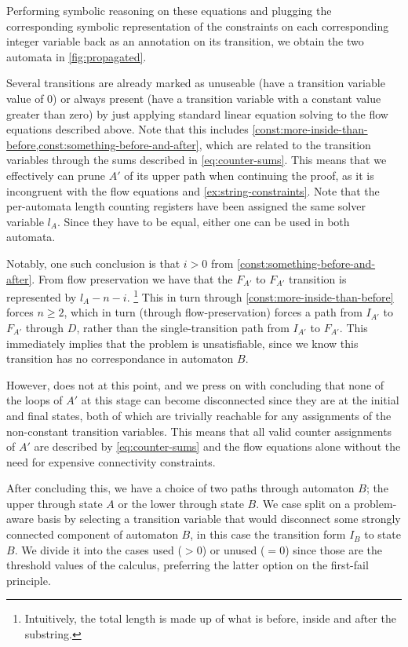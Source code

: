 Performing symbolic reasoning on these equations and plugging the corresponding
symbolic representation of the constraints on each corresponding integer
variable back as an annotation on its transition, we obtain the two automata in
\cref{fig:propagated}.

Several transitions are already marked as unuseable (have a transition variable
value of $0$) or always present (have a transition variable with a constant
value greater than zero) by just applying standard linear equation solving to
the flow equations described above. Note that this includes
\cref{const:more-inside-than-before,const:something-before-and-after}, which are
related to the transition variables through the sums described in
\cref{eq:counter-sums}. This means that we effectively can prune $A'$ of its
upper path when continuing the proof, as it is incongruent with the flow
equations and \cref{ex:string-constraints}. Note that the per-automata length
counting registers have been assigned the same solver variable $l_A$. Since they
have to be equal, either one can be used in both automata.

Notably, one such conclusion is that $i > 0$ from
\cref{const:something-before-and-after}. From flow preservation we have that the
$F_{A'}$ to $F_{A'}$ transition is represented by $l_A - n - i$.
\footnote{Intuitively, the total length is made up of what is before, inside and
after the substring.} This in turn through \cref{const:more-inside-than-before}
forces $n \geq 2$, which in turn (through flow-preservation) forces a path from
$I_{A'}$ to $F_{A'}$ through $D$, rather than the single-transition path from
$I_{A'}$ to $F_{A'}$. This immediately implies that the problem is
unsatisfiable, since we know this transition has no correspondance in automaton
$B$. 

However, \Calculus{} does not at this point, and we press on with concluding
that none of the loops of $A'$ at this stage can become disconnected since
they are at the initial and final states, both of which are trivially reachable
for any assignments of the non-constant transition variables. This means that
all valid counter assignments of $A'$ are described by \cref{eq:counter-sums}
and the flow equations alone without the need for expensive connectivity
constraints.

After concluding this, we have a choice of two paths through automaton $B$; the
upper through state $A$ or the lower through state $B$. We case split on a
problem-aware basis by selecting a transition variable that would disconnect
some strongly connected component of automaton $B$, in this case the transition
form $I_B$ to state $B$. We divide it into the cases used ($> 0$) or unused ($ =
0$) since those are the threshold values of the calculus, preferring the latter
option on the first-fail principle.

